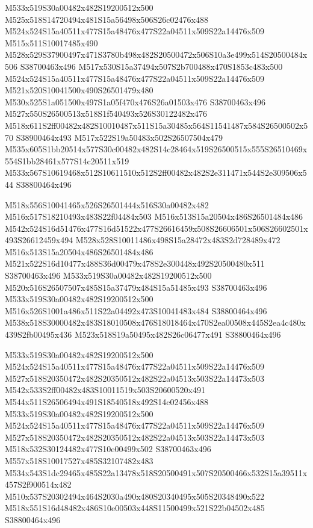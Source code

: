 \documentclass{article}
\begin{document}
\begin{multicols}{2}
M533x519S30a00482x482S19200512x500 M525x518S14720494x481S15a56498x506S26c02476x488 M524x524S15a40511x477S15a48476x477S22a04511x509S22a14476x509 M515x511S10017485x490 M528x529S37900497x471S3780b498x482S20500472x506S10a3e499x514S20500484x506 S38700463x496 M517x530S15a37494x507S2b700488x470S1853c483x500 M524x524S15a40511x477S15a48476x477S22a04511x509S22a14476x509 M521x520S10041500x490S26501479x480 M530x525S1a051500x497S1a05f470x476S26a01503x476 S38700463x496 M527x550S26500513x518S1f540493x526S30122482x476 M518x611S2ff00482x482S10010487x511S15a30485x564S11541487x584S26500502x570 S38900464x493 M517x522S19a50483x502S26507504x479 M535x605S1bb20514x577S30c00482x482S14c28464x519S26500515x555S26510469x554S1bb28461x577S14c20511x519 M533x567S10619468x512S10611510x512S2ff00482x482S2e311471x544S2e309506x544 S38800464x496

M518x556S10041465x526S26501444x516S30a00482x482 M516x517S18210493x483S22f04484x503 M516x513S15a20504x486S26501484x486 M542x524S16d51476x477S16d51522x477S26616459x508S26606501x506S26602501x493S26612459x494 M528x528S10011486x498S15a28472x483S2d728489x472 M516x513S15a20504x486S26501484x486 M521x522S16d10477x488S36d00479x478S2e300448x492S20500480x511 S38700463x496 M533x519S30a00482x482S19200512x500 M520x516S26507507x485S15a37479x484S15a51485x493 S38700463x496 M533x519S30a00482x482S19200512x500 M516x526S1001a486x511S22a04492x473S10041483x484 S38800464x496 M538x518S30000482x483S18010508x476S18018464x470S2ea00508x445S2ea4c480x439S2fb00495x436 M523x518S19a50495x482S26c06477x491 S38800464x496

M533x519S30a00482x482S19200512x500 M524x524S15a40511x477S15a48476x477S22a04511x509S22a14476x509 M527x518S20350472x482S20350512x482S22a04513x503S22a14473x503 M542x533S2ff00482x483S10011519x503S20600520x491 M544x511S26506494x491S18540518x492S14c02456x488 M533x519S30a00482x482S19200512x500 M524x524S15a40511x477S15a48476x477S22a04511x509S22a14476x509 M527x518S20350472x482S20350512x482S22a04513x503S22a14473x503 M518x532S30124482x477S10e00499x502 S38700463x496 M557x518S10017527x485S32107482x483 M534x543S1dc29465x485S22a13478x518S20500491x507S20500466x532S15a39511x457S2f900514x482 M510x537S20302494x464S2030a490x480S20340495x505S20348490x522 M518x551S16d48482x486S10e00503x448S11500499x521S22b04502x485 S38800464x496


\end{multicols}
\end{document}
